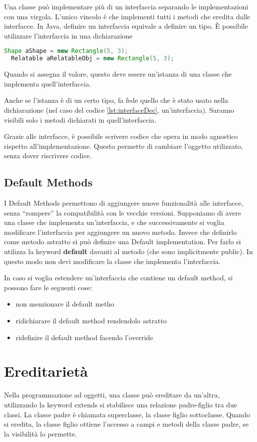 \documentclass[a4paper,12pt,twoside]{book}
\begin{document}
Una classe può implementare più di un interfaccia separando le
implementazioni con una virgola. L'unico vincolo è che implementi
tutti i metodi che eredita dalle interfacce.
In Java, definire un interfaccia equivale a definire un
tipo. È possibile utilizzare l'interfaccia in una dichiarazione

\begin{lstlisting}[caption={Dichiarazione interfaccia},
  label={lst:interfaceDec},language=Java]
  Shape aShape = new Rectangle(5, 3);
  Relatable aRelatableObj = new Rectangle(5, 3);
\end{lstlisting}
Quando si assegna il valore, questo deve essere un'istanza di una
classe che implementa quell'interfaccia.

Anche se l'istanza è di un certo tipo, fa fede quello che è stato
usato nella dichiarazione (nel caso del codice \ref{lst:interfaceDec},
un'interfaccia). Saranno visibili solo i metodi dichiarati in
quell'interfaccia.

Grazie alle interfacce, è possibile scrivere codice che opera in modo
agnostico rispetto all'implementazione. Questo permette di cambiare
l'oggetto utilizzato, senza dover riscrivere codice.
\subsection{Default Methods}
I Default Methods permettono di aggiungere nuove funzionalità alle
interfacce, senza “rompere” la compatibilità con le vecchie versioni.
Supponiamo di avere una classe che implementa un'interfaccia,
e che successivamente si voglia modificare l'interfaccia per aggiungere un
nuovo metodo. Invece che definirlo come metodo astratto si può
definire una Default implementation. Per farlo si utilizza la keyword
\textbf{default} davanti al metodo (che sono implicitmente public). In
questo modo non devi modificare la classe che implementa
l'interfaccia.

In caso si voglia estendere un'interfaccia che contiene un default
method, si possono fare le seguenti cose:
\begin{itemize}
\item non menzionare il default metho
\item ridichiarare il default method rendendolo astratto
\item ridefinire il default method facendo l'override
\end{itemize}



\section{Ereditarietà}
Nella programmazione ad oggetti, una classe può ereditare da un'altra,
utilizzando la keyword extends si stabilisce una relazione
padre-figlio tra due classi. La classe padre è chiamata superclasse,
la classe figlio sottoclasse. Quando si eredita, la classe figlio
ottiene l'accesso a campi e metodi della classe padre, se la
visibilità lo permette. 
\end{document}
